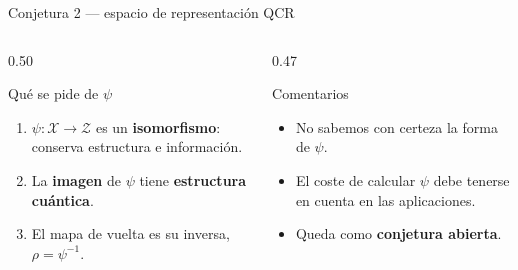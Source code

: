 \documentclass[aspectratio=169,10pt,professionalfonts]{beamer}
\begin{document}
\begin{frame}{Conjetura 2 --- espacio de representación QCR}
\begin{center}
\end{center}
\vspace{-2.2em}
\begin{columns}[T]
\begin{column}{0.50\textwidth}
\begin{block}{Qué se pide de $\psi$}
{\footnotesize
\begin{enumerate}
  \item $\psi:\mathcal{X}\to\mathcal{Z}$ es un \textbf{isomorfismo}: conserva estructura e información.
  \item La \textbf{imagen} de $\psi$ tiene \textbf{estructura cuántica}.
  \item El mapa de vuelta es su inversa, $\rho=\psi^{-1}$.
\end{enumerate}
}
\end{block}
\end{column}
\begin{column}{0.47\textwidth}
\begin{alertblock}{Comentarios}
{\footnotesize
\begin{itemize}
  \item No sabemos con certeza la forma de $\psi$.
  \item El coste de calcular $\psi$ debe tenerse en cuenta en las aplicaciones.
  \item Queda como \textbf{conjetura abierta}.
\end{itemize}
}
\end{alertblock}
\end{column}
\end{columns}
\end{frame}
\end{document}
